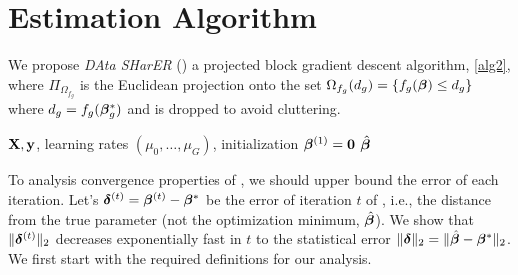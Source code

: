 
\section{Estimation Algorithm}
\label{sec:opt}
We propose \emph{DAta SHarER} (\dc) a projected block gradient descent algorithm, \cref{alg2}, where $\Pi_{\Omega_{f_g}}$ is the Euclidean projection onto the set $\Omega_{f_g}(d_g) = \{f_g(\boldsymbol{\beta}) \leq d_g\}$ where $d_g = f_g(\boldsymbol{\beta}_g^*)$ and is dropped to avoid cluttering. %

\begin{algorithm}[t]
	\caption{  \dc }
	\label{alg2}
	\begin{algorithmic}[1]
		 $\mathbf{X}, \mathbf{y}$, learning rates $(\mu_0, \dots, \mu_G)$, initialization $\boldsymbol{\beta} ^{(1)} = \mathbf{0}$
		 $\hat{\boldsymbol{\beta}}$
		\ENDFOR
		\ENDFOR
	\end{algorithmic}
\end{algorithm}

To analysis convergence properties of \dc, we should upper bound the error of each iteration.
Let's $\boldsymbol{\delta}^{(t)} = \boldsymbol{\beta}^{(t)} - \boldsymbol{\beta}^*$ be the error of  iteration $t$ of \dc, i.e., the distance from the true parameter (not the optimization minimum, $\hat{\boldsymbol{\beta}}$). We show that $\|\boldsymbol{\delta}^{(t)}\|_{2}$ decreases exponentially fast in $t$ to the statistical error $\|\boldsymbol{\delta}\|_{2} = \|\hat{\boldsymbol{\beta}} - \boldsymbol{\beta}^*\|_{2}$. We first start with the required definitions for our analysis.

